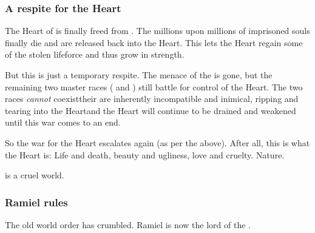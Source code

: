 \subsubsection{A respite for the Heart}
The Heart of \Miith{} is finally freed from . 
The millions upon millions of imprisoned souls finally die and are released back into the Heart. 
This lets the Heart regain some of the stolen lifeforce and thus grow in strength. 

But this is just a temporary respite. 
The menace of the \banes{} is gone, but the remaining two master races (\dragons{} and \resphain) still battle for control of the Heart. 
The two races \emph{cannot} coexist\dash their \matrices{} are inherently incompatible and inimical, ripping and tearing into the Heart\dash and the Heart will continue to be drained and weakened until this war comes to an end. 

So the war for the Heart escalates again (as per the  above). 
After all, this is what the Heart is: 
Life and death, beauty and ugliness, love and cruelty. 
Nature. 

\Miith{} is a cruel world. 





\subsubsection{Ramiel rules}
The old world order has crumbled. 
Ramiel is now the lord of the \resphain.






